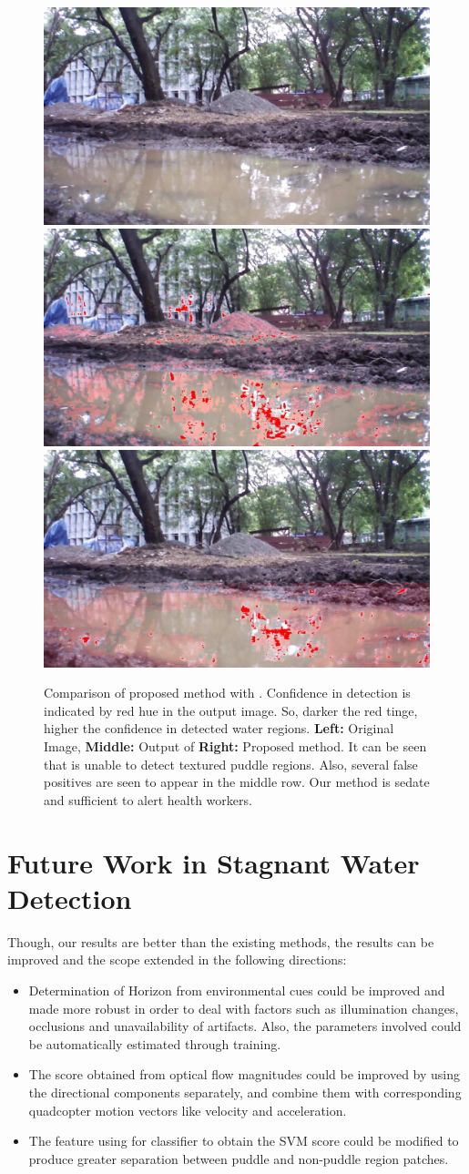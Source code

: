 \documentclass[11pt]{article}
\begin{document}
\begin{figure}
  \includegraphics[width=0.32\linewidth]{stagnantWater/results/dataset_63full/IMG_PAIR_102_1} \hfill
  \includegraphics[width=0.32\linewidth]{stagnantWater/results/dataset_63full/output_102_jpl2} \hfill
  \includegraphics[width=0.32\linewidth]{stagnantWater/results/dataset_63full/output_102}
  	
  \caption{Comparison of proposed method with \cite{rankin2004daytime}. Confidence in detection is indicated by red hue in the output image. 
So, darker the red tinge, higher the confidence in detected water regions. \textbf{Left:} Original Image,
    \textbf{Middle:} Output of \cite{rankin2004daytime} \textbf{Right:}
    Proposed method. It can be seen that \cite{rankin2004daytime} is unable to
    detect textured puddle regions. Also, several false positives are
    seen to appear in the middle row.  Our method is sedate and
    sufficient to alert health workers.}
\label{fig:comparison}
\end{figure}

\section{Future Work in Stagnant Water Detection}
Though, our results are better than the existing methods, the results can be improved and the scope
extended in the following directions:
\begin{itemize}
  \item Determination of Horizon from environmental cues could be improved and made
  more robust in order to deal with factors such as illumination changes,
  occlusions and unavailability of artifacts. Also, the parameters involved
  could be automatically estimated through training.
  \item The score obtained from optical flow magnitudes could be improved by
  using the directional components separately, and combine them with
  corresponding quadcopter motion vectors like velocity and acceleration.
  \item The feature using for classifier to obtain the SVM score could be
  modified to produce greater separation between puddle and non-puddle region
  patches.
\end{itemize}
\newpage


\end{document}
